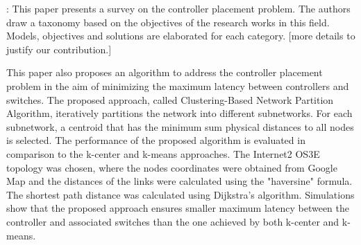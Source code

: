 \documentclass[a4paper,10pt]{article}
\begin{document}


\cite{WaZh17}: This paper presents a survey on the controller placement problem. The authors draw a taxonomy based on the objectives of the research works in this field. Models, objectives and solutions are elaborated for each category. [more details to justify our contribution.] 

This paper also proposes an algorithm to address the controller placement problem in the aim of minimizing the maximum latency between controllers and switches. The proposed approach, called Clustering-Based Network Partition Algorithm, iteratively partitions the network into different subnetworks. For each subnetwork, a centroid that has the minimum sum physical distances to all nodes is selected. The performance of the proposed algorithm is evaluated in comparison to the k-center and k-means approaches. The Internet2 OS3E topology was chosen, where the nodes coordinates were obtained from Google Map and the distances of the links were calculated using the "haversine" formula. The shortest path distance was calculated using Dijkstra's algorithm. Simulations show that the proposed approach ensures smaller maximum latency between the controller and associated switches than the one achieved by both k-center and k-means. 



\end{document}
